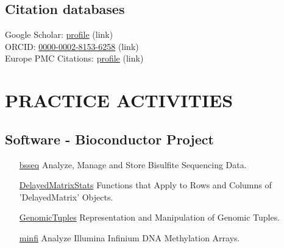 \documentclass[11pt,letterpaper,pdf]{article}
\begin{document}

\printbibliography[title=Journal Articles (peer reviewed),keyword=peerjournal,prenote=mynote]

\printbibliography[title={Journal Articles, Consortia member (peer reviewed)},keyword=peerconsortia]

\printbibliography[title=Preprints (not peer reviewed),keyword=preprint,prenote=mynote]

\printbibliography[title={Books, Theses, Editorials, Abandoned Preprints (not peer reviewed)},keyword=others,prenote=mynote]

\printbibliography[title={Preprints, subsequently published (not peer reviewed)},keyword=pubpreprint,prenote=mynote]

\subsection*{Citation databases}

\vspace*{0.5\baselineskip}

Google Scholar: \href{https://scholar.google.com.au/citations?user=pQhJuagAAAAJ&hl=en}{profile} (link)\\
ORCID: \href{https://orcid.org/0000-0002-8153-6258}{0000-0002-8153-6258} (link)\\
Europe PMC Citations: \href{https://europepmc.org/authors/0000-0002-8153-6258}{profile} (link)

\section*{PRACTICE ACTIVITIES}

\subsection*{Software - Bioconductor Project}

\begin{enumerate}[labelindent=1cm,align=left]
  \item[\href{http://www.bioconductor.org/packages/bsseq}{bsseq}]
    Analyze, Manage and Store Bisulfite Sequencing Data.
  \item[\href{http://www.bioconductor.org/packages/DelayedMatrixStats}{DelayedMatrixStats}]
    Functions that Apply to Rows and Columns of 'DelayedMatrix' Objects.
  \item[\href{http://www.bioconductor.org/packages/GenomicTuples}{GenomicTuples}]
    Representation and Manipulation of Genomic Tuples.
  \item[\href{http://www.bioconductor.org/packages/minfi}{minfi}]
    Analyze Illumina Infinium DNA Methylation Arrays.
\end{enumerate}
\end{document}
